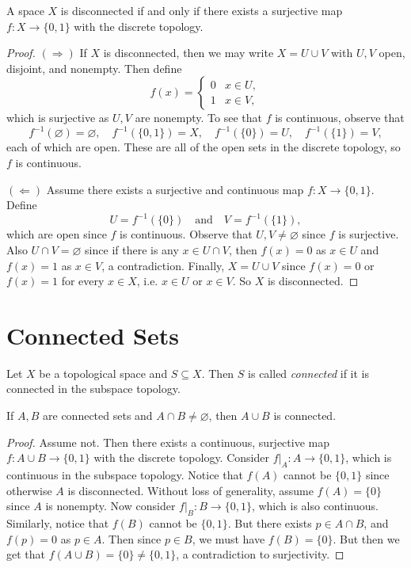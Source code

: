 \begin{theorem}
  A space $X$ is disconnected if and only if
  there exists a surjective map
  $f : X \to \{0, 1\}$ with the discrete topology.
\end{theorem}

\begin{proof}
  $(\Rightarrow)$
  If $X$ is disconnected, then we may write
  $X = U \cup V$ with $U, V$ open, disjoint, and
  nonempty. Then define
  \[
    f(x) = \begin{cases}
      0 & x \in U, \\
      1 & x \in V,
    \end{cases}
  \]
  which is surjective as $U, V$ are nonempty. To
  see that $f$ is continuous, observe that
  \[
    f^{-1}(\varnothing) = \varnothing, \quad
    f^{-1}(\{0, 1\}) = X, \quad
    f^{-1}(\{0\}) = U, \quad
    f^{-1}(\{1\}) = V,
  \]
  each of which are open. These are all of
  the open sets in the discrete topology, so $f$ is
  continuous.

  $(\Leftarrow)$ Assume there exists a surjective
  and continuous map $f : X \to \{0, 1\}$. Define
  \[
    U = f^{-1}(\{0\}) \quad \text{and} \quad
    V = f^{-1}(\{1\}),
  \]
  which are open since $f$ is continuous. Observe
  that $U, V \ne \varnothing$ since $f$ is surjective.
  Also $U \cap V = \varnothing$ since if there is
  any $x \in U \cap V$, then
  $f(x) = 0$ as $x \in U$ and $f(x) = 1$ as $x \in V$,
  a contradiction.
  Finally, $X = U \cup V$ since $f(x) = 0$ or
  $f(x) = 1$ for every $x \in X$, i.e.
  $x \in U$ or $x \in V$. So $X$ is disconnected.
\end{proof}

\section{Connected Sets}
\begin{definition}
  Let $X$ be a topological space and $S \subseteq X$.
  Then $S$ is called
  \emph{connected} if it is connected in the
  subspace topology.
\end{definition}

\begin{theorem}
  If $A, B$ are connected sets and
  $A \cap B \ne \varnothing$, then $A \cup B$
  is connected.
\end{theorem}

\begin{proof}
  Assume not. Then there exists a continuous,
  surjective map
  $f : A \cup B \to \{0, 1\}$ with the discrete
  topology. Consider $f|_A : A \to \{0, 1\}$,
  which is continuous in the subspace topology.
  Notice that $f(A)$ cannot be $\{0, 1\}$ since
  otherwise $A$ is disconnected. Without
  loss of generality, assume $f(A) = \{0\}$ since
  $A$ is nonempty. Now consider
  $f|_B : B \to \{0, 1\}$, which is also
  continuous. Similarly, notice that
  $f(B)$ cannot be $\{0, 1\}$. But
  there exists
  $p \in A \cap B$, and $f(p) = 0$ as $p \in A$.
  Then since $p \in B$, we must have $f(B) = \{0\}$.
  But then we get that $f(A \cup B) = \{0\} \ne \{0, 1\}$,
  a contradiction to surjectivity.
\end{proof}

